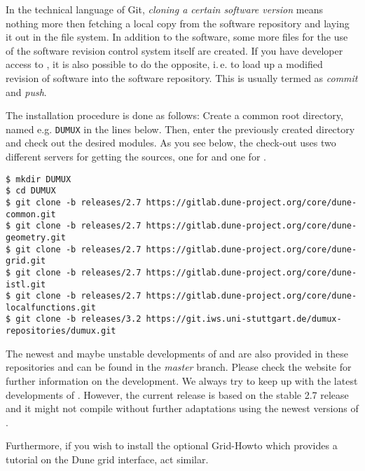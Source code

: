 In the technical language of Git, \emph{cloning a certain software version} means nothing more then fetching
a local copy from the software repository and laying it out in the file system.
In addition to the software, some more files for the use of the software revision
control system itself are created. If you have developer access to \Dumux, it is
also possible to do the opposite, i.\,e. to load up a modified revision of software
into the software repository. This is usually termed as \emph{commit} and \emph{push}.

The installation procedure is done as follows:
Create a common root directory, named e.g. \texttt{DUMUX} in the lines below.
Then, enter the previously created directory and check out the desired modules.
As you see below, the check-out uses two different servers for getting the sources,
one for \Dune and one for \Dumux.

\begin{lstlisting}[style=Bash]
$ mkdir DUMUX
$ cd DUMUX
$ git clone -b releases/2.7 https://gitlab.dune-project.org/core/dune-common.git
$ git clone -b releases/2.7 https://gitlab.dune-project.org/core/dune-geometry.git
$ git clone -b releases/2.7 https://gitlab.dune-project.org/core/dune-grid.git
$ git clone -b releases/2.7 https://gitlab.dune-project.org/core/dune-istl.git
$ git clone -b releases/2.7 https://gitlab.dune-project.org/core/dune-localfunctions.git
$ git clone -b releases/3.2 https://git.iws.uni-stuttgart.de/dumux-repositories/dumux.git
\end{lstlisting}

The newest and maybe unstable developments of \Dune and \Dumux are also provided in these repositories and can be found in the \emph{master} branch.
Please check the \Dune website \cite{DUNE-HP} for further information on the \Dune development. We always try to keep up with the latest developments of \Dune.
However, the current \Dumux release is based on the stable 2.7 release and it might not compile without further adaptations using the newest versions of \Dune.

Furthermore, if you wish to install the optional \Dune Grid-Howto which provides a tutorial
on the Dune grid interface, act similar.

